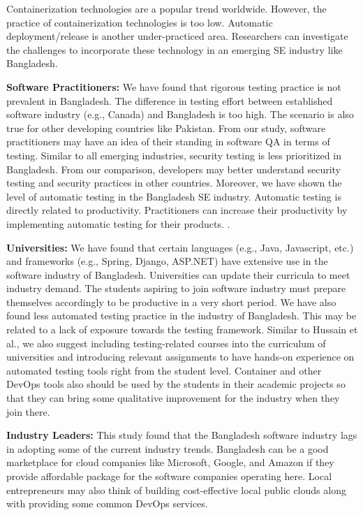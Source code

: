 Containerization technologies are a popular trend worldwide. However, the practice of containerization technologies is too low. Automatic deployment/release is another under-practiced area. Researchers can investigate the challenges to incorporate these technology in an emerging SE industry like Bangladesh.

\indent \textbf{Software Practitioners:}  We have found that rigorous testing practice is not prevalent in Bangladesh. The difference in testing effort between established software industry (e.g., Canada) and Bangladesh is too high. The scenario is also true for other developing countries like Pakistan. From our study, software practitioners may have an idea of their standing in software QA in terms of testing. Similar to all emerging industries, security testing is less prioritized in Bangladesh. From our comparison, developers may better understand security testing and security practices in other countries. Moreover, we have shown the level of automatic testing in the Bangladesh SE industry. Automatic testing is directly related to productivity. Practitioners can increase their productivity by implementing automatic testing for their products. .

\indent \textbf{Universities:} We have found that certain languages (e.g., Java, Javascript, etc.) and frameworks (e.g., Spring, Django, ASP.NET) have extensive use in the software industry of Bangladesh. Universities can update their curricula to meet industry demand. The students aspiring to join software industry must prepare themselves accordingly to be productive in a very short period. We have also found less automated testing practice in the industry of Bangladesh. This may be related to a lack of exposure towards the testing framework. Similar to  Hussain et al.\cite{Hussain2020}, we also suggest including testing-related courses into the curriculum of universities and introducing relevant assignments to have hands-on experience on automated testing tools right from the student level. Container and other DevOps tools also should be used by the students in their academic projects so that they can bring some qualitative improvement for the industry when they join there.


\indent \textbf{Industry Leaders:} This study found that the Bangladesh software industry lags in adopting some of the current industry trends. Bangladesh can be a good marketplace for cloud companies like Microsoft, Google, and Amazon if they provide affordable package for the software companies operating here. Local entrepreneurs may also think of building cost-effective local public clouds along with providing some common DevOps services.   

